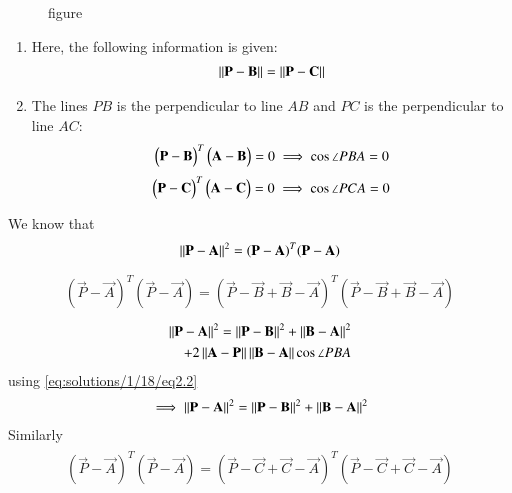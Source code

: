  \begin{figure}[!ht]
\centering
\resizebox{\columnwidth}{!}{}
\caption{figure}
\label{eq:solutions/1/18/fig1}
\end{figure}
\begin{enumerate}
    \item Here, the following information is given:
    \begin{align}
    \left\lVert\mathbf{P}-\mathbf{B}\right\rVert=\left\lVert\mathbf{P}-\mathbf{C}\right\rVert \label{eq:solutions/1/18/eq2.1}
    \end{align}
    \item The lines $PB$ is the perpendicular to line $AB$ and 
    $PC$ is the perpendicular to line $AC$:
    \begin{align}
    \begin{pmatrix}\mathbf{P}-\mathbf{B}\end{pmatrix}^T\begin{pmatrix}\mathbf{A}-\mathbf{B}\end{pmatrix}=0 \label{eq:solutions/1/18/eq2.2}
    \implies \cos\angle PBA=0 
    \end{align}
    \begin{align}
    \begin{pmatrix}\mathbf{P}-\mathbf{C}\end{pmatrix}^T\begin{pmatrix}\mathbf{A}-\mathbf{C}\end{pmatrix}=0 \label{eq:solutions/1/18/eq2.3}
    \implies \cos\angle PCA=0 
    \end{align}
\end{enumerate}
We know that 
\begin{align}
\left\lVert\mathbf{P-A}\right\rVert^2=(\mathbf{P}-\mathbf{A})^T(\mathbf{P}-\mathbf{A})
\end{align}
\begin{align}
 \begin{split}
(\vec{P}-\vec{A})^T(\vec{P}-\vec{A})=(\vec{P}-\vec{B}+\vec{B}-\vec{A})^T(\vec{P}-\vec{B}+\vec{B}-\vec{A})
\end{split}
\end{align}
\begin{align}
 \begin{split}
\left\lVert\mathbf{P-A}\right\rVert^2=\left\lVert\mathbf{P-B}\right\rVert^2+\left\lVert\mathbf{B-A}\right\rVert^2\\ 
+2\left\lVert\mathbf{A}-\mathbf{P}\right\rVert\left\lVert\mathbf{B}-\mathbf{A}\right\rVert\cos\angle PBA \\
\end{split}
\end{align}
using \eqref{eq:solutions/1/18/eq2.2}
\begin{align}
 \begin{split}
 \implies \left\lVert\mathbf{P-A}\right\rVert^2=\left\lVert\mathbf{P-B}\right\rVert^2+\left\lVert\mathbf{B-A}\right\rVert^2 \label{eq:solutions/1/18/eq2.4} \\
 \end{split}
\end{align}
Similarly
\begin{align}
 \begin{split}
(\vec{P}-\vec{A})^T(\vec{P}-\vec{A})=(\vec{P}-\vec{C}+\vec{C}-\vec{A})^T(\vec{P}-\vec{C}+\vec{C}-\vec{A})
\end{split}
\end{align}
